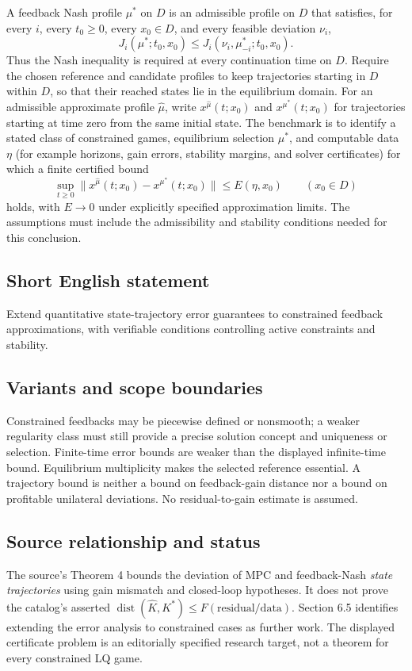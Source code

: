 \documentclass[11pt,a4paper]{article}
\begin{document}
A feedback Nash profile $\mu^*$ on $D$ is an admissible profile on $D$ that satisfies, for every $i$, every $t_0\geq0$, every $x_0\in D$, and every feasible deviation $\nu_i$,
\[
 J_i(\mu^*;t_0,x_0)\leq J_i(\nu_i,\mu^*_{-i};t_0,x_0).
\]
Thus the Nash inequality is required at every continuation time on $D$. Require the chosen reference and candidate profiles to keep trajectories starting in $D$ within $D$, so that their reached states lie in the equilibrium domain. For an admissible approximate profile $\widehat\mu$, write
$x^{\widehat\mu}(t;x_0)$ and $x^{\mu^*}(t;x_0)$ for trajectories starting at time zero from the same initial state. The benchmark is to identify a stated class of constrained games, equilibrium selection $\mu^*$, and computable data $\eta$ (for example horizons, gain errors, stability margins, and solver certificates) for which a finite certified bound
\[
 \sup_{t\geq0}\|x^{\widehat\mu}(t;x_0)-x^{\mu^*}(t;x_0)\|
      \leq E(\eta,x_0)\qquad(x_0\in D)
\]
holds, with $E\to0$ under explicitly specified approximation limits. The assumptions must include the admissibility and stability conditions needed for this conclusion.

\subsection*{Short English statement}
Extend quantitative state-trajectory error guarantees to constrained feedback approximations, with verifiable conditions controlling active constraints and stability.

\subsection*{Variants and scope boundaries}
Constrained feedbacks may be piecewise defined or nonsmooth; a weaker regularity class must still provide a precise solution concept and uniqueness or selection. Finite-time error bounds are weaker than the displayed infinite-time bound. Equilibrium multiplicity makes the selected reference essential. A trajectory bound is neither a bound on feedback-gain distance nor a bound on profitable unilateral deviations. No residual-to-gain estimate is assumed.

\subsection*{Source relationship and status}
The source's Theorem 4 bounds the deviation of MPC and feedback-Nash \emph{state trajectories} using gain mismatch and closed-loop hypotheses. It does not prove the catalog's asserted $\operatorname{dist}(\widehat K,K^*)\leq F(\text{residual/data})$. Section 6.5 identifies extending the error analysis to constrained cases as further work. The displayed certificate problem is an editorially specified research target, not a theorem for every constrained LQ game.
\end{document}
